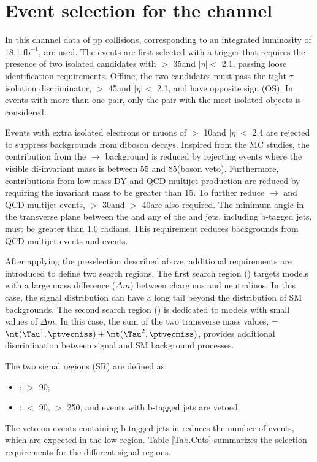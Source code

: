 \section{\texorpdfstring{Event selection for the \tauTau channel}{Event selection for the tau-tau channel}}
\label{sect:tauTauCuts}
In this channel data of pp collisions,  corresponding to an integrated luminosity of 18.1 $\mathrm{fb}^{-1}$, are used.
The events are first selected with a trigger \cite{Chatrchyan:2011nv} that requires the presence of two isolated 
\Tau candidates with \PT $>$ 35\GeV and $|\eta|<$ 2.1, passing loose identification requirements.
Offline, the two \Tau candidates must pass the tight $\tau$ isolation discriminator,
\PT $>$ 45\GeV and $|\eta|<$ 2.1, and have opposite sign (OS).
In events with more than one \tauTau pair, only the pair with the most isolated \Tau objects is considered. 

Events with extra isolated electrons or muons of \PT $>$ 10\GeV and $|\eta| <$ 2.4 
are rejected to suppress backgrounds from diboson decays. 
Inspired from the MC studies, 
the contribution from the \Z$ \rightarrow$ \tauTau  background is reduced by rejecting events 
where the visible di-\Tau invariant mass is between 55 and 85\GeV (\Z boson veto).  
Furthermore, contributions from low-mass DY and QCD multijet production are 
reduced by requiring the invariant mass to be greater than 15\GeV.
To further reduce \Z $\rightarrow$ \tauTau and QCD multijet events, 
\MPT $>$ 30\GeV and \mttwo $>$ 40\GeV are also required.
The minimum angle \deltaphi in the transverse plane between the \ptvecmiss and any of the \Tau and jets, 
including b-tagged jets, must be greater than 1.0 radians. 
This requirement reduces backgrounds from QCD multijet events and \wjets events.

After applying the preselection described above,
additional requirements are introduced to define two search regions.
The first search region (\binone) targets models with a large mass difference ($\Delta m$) 
between charginos and neutralinos.
In this case, the \mttwo signal distribution can have a long tail beyond the 
distribution of SM backgrounds.
The second search region (\bintwo) is dedicated to models with small values of $\Delta m$.
In this case, the sum of the two transverse mass values, \SumMT = $\mt(\Tau^1,\ptvecmiss) + \mt(\Tau^2,\ptvecmiss)$, 
provides additional discrimination between signal and SM background processes.

The two signal regions (SR) are defined as:
\begin{itemize}
\item {\bf \binone}: \mttwo $>$ 90\GeV;
\item {\bf \bintwo}:  \mttwo $<$ 90\GeV, \SumMT $>$ 250\GeV, and events with b-tagged jets are vetoed.
\end{itemize}
The veto on events containing b-tagged jets in \bintwo reduces the number of \ttbar events, which are expected in  the low-\mttwo region. 
Table \ref{Tab.Cuts} summarizes the selection requirements for the different signal regions.
